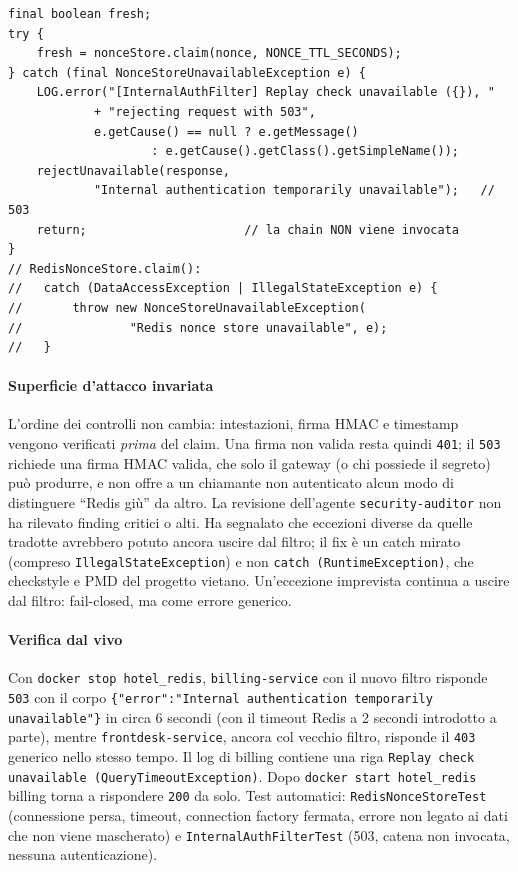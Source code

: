 ﻿\documentclass[a4paper,12pt]{report}
\begin{document}
\begin{securebox}[title={InternalAuthFilter.java / RedisNonceStore.java --- fail-closed con 503 (fix)}]
\begin{lstlisting}[style=java]
final boolean fresh;
try {
    fresh = nonceStore.claim(nonce, NONCE_TTL_SECONDS);
} catch (final NonceStoreUnavailableException e) {
    LOG.error("[InternalAuthFilter] Replay check unavailable ({}), "
            + "rejecting request with 503",
            e.getCause() == null ? e.getMessage()
                    : e.getCause().getClass().getSimpleName());
    rejectUnavailable(response,
            "Internal authentication temporarily unavailable");   // 503
    return;                      // la chain NON viene invocata
}
// RedisNonceStore.claim():
//   catch (DataAccessException | IllegalStateException e) {
//       throw new NonceStoreUnavailableException(
//               "Redis nonce store unavailable", e);
//   }
\end{lstlisting}
\end{securebox}

\paragraph{Superficie d'attacco invariata}
L'ordine dei controlli non cambia: intestazioni, firma HMAC e timestamp
vengono verificati \emph{prima} del claim. Una firma non valida resta quindi
\texttt{401}; il \texttt{503} richiede una firma HMAC valida, che solo il
gateway (o chi possiede il segreto) pu\`o produrre, e non offre a un chiamante
non autenticato alcun modo di distinguere ``Redis gi\`u'' da altro. La revisione
dell'agente \texttt{security-auditor} non ha rilevato finding critici o alti.
Ha segnalato che eccezioni diverse da quelle tradotte avrebbero potuto
ancora uscire dal filtro; il fix \`e un catch mirato (compreso
\texttt{IllegalStateException}) e non \texttt{catch (RuntimeException)}, che
checkstyle e PMD del progetto vietano. Un'eccezione imprevista continua a
uscire dal filtro: fail-closed, ma come errore generico.

\paragraph{Verifica dal vivo}
Con \texttt{docker stop hotel\_redis}, \texttt{billing-service} con il nuovo
filtro risponde \texttt{503} con il corpo
\texttt{\{"error":"Internal authentication temporarily unavailable"\}} in circa
6 secondi (con il timeout Redis a 2 secondi introdotto a parte), mentre
\texttt{frontdesk-service}, ancora col vecchio filtro, risponde il
\texttt{403} generico nello stesso tempo. Il log di billing contiene una riga
\texttt{Replay check unavailable (QueryTimeoutException)}. Dopo
\texttt{docker start hotel\_redis} billing torna a rispondere \texttt{200} da
solo. Test automatici: \texttt{RedisNonceStoreTest} (connessione persa,
timeout, connection factory fermata, errore non legato ai dati che non viene
mascherato) e \texttt{InternalAuthFilterTest} (503, catena non invocata,
nessuna autenticazione).
\end{document}
